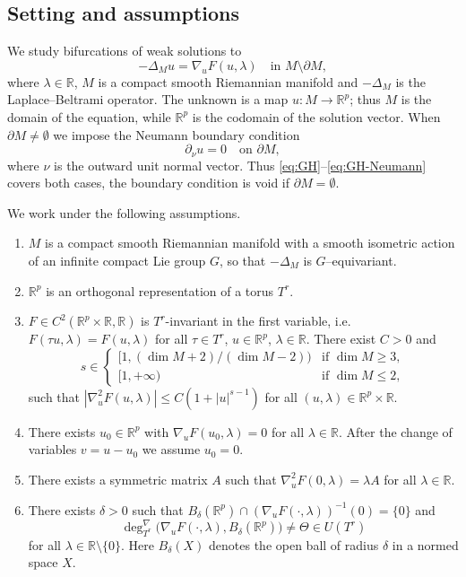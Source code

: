 \documentclass[reqno,twoside,12pt]{amsart}
\newcommand{\bR}{\mathbb{R}}
\numberwithin{equation}{section} \errorcontextlines=0
\begin{document}
\subsection{Setting and assumptions}\label{subsec:system}

We study bifurcations of weak solutions to
\begin{equation}\label{eq:GH}
-\Delta_{M}u=\nabla_{u}F(u,\lambda) \quad\text{in } M\setminus\partial M,
\end{equation}
where $\lambda\in\mathbb{R}$, $M$ is a compact smooth Riemannian manifold and $-\Delta_{M}$ is the Laplace--Beltrami operator. The unknown is a map $u:M\to\bR^p$; thus $M$ is the domain of the equation, while $\bR^p$ is the codomain of the solution vector. When $\partial M\neq\emptyset$ we impose the Neumann boundary condition
\begin{equation}\label{eq:GH-Neumann}
\partial_{\nu}u=0 \quad\text{on } \partial M,
\end{equation}
where $\nu$ is the outward unit normal vector. Thus \eqref{eq:GH}--\eqref{eq:GH-Neumann} covers both cases, the boundary condition is void if $\partial M=\emptyset$.

We work under the following assumptions.

\begin{enumerate}
\item[(B1)] $M$ is a compact smooth Riemannian manifold with a smooth isometric action of an infinite compact Lie group $G$, so that $-\Delta_{M}$ is $G$--equivariant.

\item[(B2)] $\bR^{p}$ is an orthogonal representation of a torus $T^{r}$.

\item[(B3)] $F\in C^{2}(\bR^{p}\times\bR,\bR)$ is $T^{r}$-invariant in the first variable, i.e. $F(\tau u,\lambda)=F(u,\lambda)$ for all $\tau\in T^{r}$, $u\in\bR^{p}$, $\lambda\in\bR$. There exist $C>0$ and
\[
s\in
\begin{cases}
[1,(\dim M+2)/(\dim M-2))&\text{if }\dim M\ge 3,\\
[1,+\infty)&\text{if }\dim M\le 2,
\end{cases}
\]
such that
$
|\nabla^{2}_{u}F(u,\lambda)|\le C (1+|u|^{s-1})$ for all $(u,\lambda)\in\bR^{p}\times\bR.
$

\item[(B4)] There exists $u_{0}\in\bR^{p}$ with $\nabla_{u}F(u_{0},\lambda)=0$ for all $\lambda\in\bR$. After the change of variables $v=u-u_{0}$ we assume $u_{0}=0$.

\item[(B5)] There exists a symmetric matrix $A$ such that
$\nabla^{2}_{u}F(0,\lambda)=\lambda A$ for all $\lambda\in\bR.$

\item[(B6)] There exists $\delta>0$ such that $B_{\delta}(\bR^{p})\cap(\nabla_{u}F(\cdot,\lambda))^{-1}(0)=\{0\}$ and
\[
\deg^{\nabla}_{T^{r}}\bigl(\nabla_{u}F(\cdot,\lambda),B_{\delta}(\bR^{p})\bigr)\ne \Theta\in U(T^{r})
\]
for all $\lambda\in\bR\setminus\{0\}$. Here $B_{\delta}(X)$ denotes the open ball of radius $\delta$ in a normed space $X$.
\end{enumerate}
\end{document}
